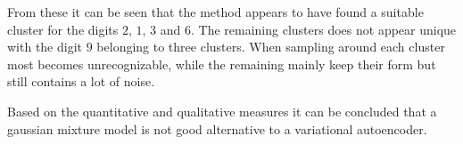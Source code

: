 From these it can be seen that the method appears to have found a suitable cluster for the digits $2$, $1$, $3$ and $6$. The remaining clusters does not appear unique with the digit $9$ belonging to three clusters. When sampling around each cluster most becomes unrecognizable, while the remaining mainly keep their form but still contains a lot of noise.  

Based on the quantitative and qualitative measures it can be concluded that a gaussian mixture model is not good alternative to a variational autoencoder. 